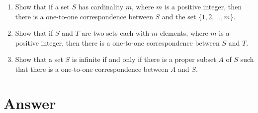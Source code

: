 \documentclass{../../cls/sig-alternate-05-2015}
\begin{document}
\begin{enumerate}
\item Show that if a set $S$ has cardinality $m$, where $m$ is a
positive integer, then there is a one-to-one correspondence
between $S$ and the set $\{1, 2, . . . , m\}$.

\item Show that if $S$ and $T$ are two sets each with $m$ elements,
where $m$ is a positive integer, then there is a
one-to-one correspondence between $S$ and $T$.

\item Show that a set $S$ is infinite if and only if there is a proper
subset $A$ of $S$ such that there is a one-to-one correspondence
between $A$ and $S$.
\end{enumerate}


\nocite{*}

 
\newpage
\appendix
\section{Answer}
\end{document}
